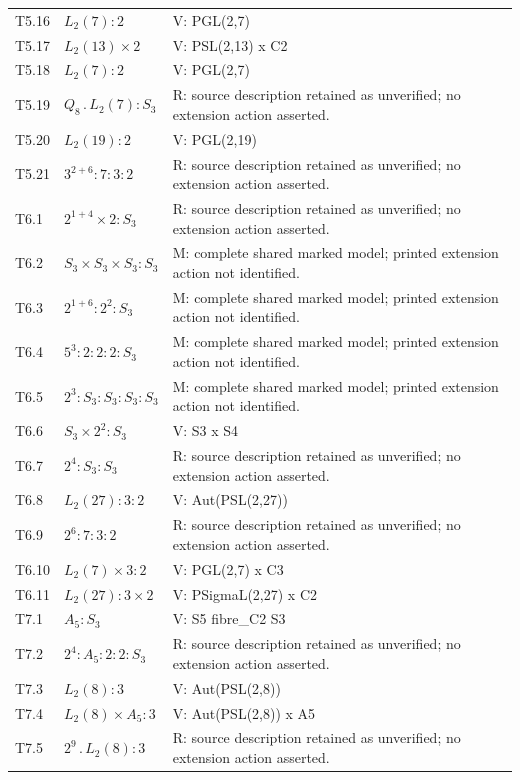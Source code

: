 \begin{longtable}{@{}lp{.40\linewidth}p{.46\linewidth}@{}}
T5.16 & $L_{2}(7) : 2$ & V: PGL(2,7)\\
T5.17 & $L_{2}(13) \times 2$ & V: PSL(2,13) x C2\\
T5.18 & $L_{2}(7) : 2$ & V: PGL(2,7)\\
T5.19 & $Q_{8} \mathbin{.} L_{2}(7) : S_{3}$ & R: source description retained as unverified; no extension action asserted.\\
T5.20 & $L_{2}(19) : 2$ & V: PGL(2,19)\\
T5.21 & $3^{2+6} : 7 : 3 : 2$ & R: source description retained as unverified; no extension action asserted.\\
T6.1 & $2^{1+4} \times 2 : S_{3}$ & R: source description retained as unverified; no extension action asserted.\\
T6.2 & $S_{3} \times S_{3} \times S_{3} : S_{3}$ & M: complete shared marked model; printed extension action not identified.\\
T6.3 & $2^{1+6} : 2^2 : S_{3}$ & M: complete shared marked model; printed extension action not identified.\\
T6.4 & $5^3 : 2 : 2 : 2 : S_{3}$ & M: complete shared marked model; printed extension action not identified.\\
T6.5 & $2^3 : S_{3} : S_{3} : S_{3} : S_{3}$ & M: complete shared marked model; printed extension action not identified.\\
T6.6 & $S_{3} \times 2^2 : S_{3}$ & V: S3 x S4\\
T6.7 & $2^4 : S_{3} : S_{3}$ & R: source description retained as unverified; no extension action asserted.\\
T6.8 & $L_{2}(27) : 3 : 2$ & V: Aut(PSL(2,27))\\
T6.9 & $2^6 : 7 : 3 : 2$ & R: source description retained as unverified; no extension action asserted.\\
T6.10 & $L_{2}(7) \times 3 : 2$ & V: PGL(2,7) x C3\\
T6.11 & $L_{2}(27) : 3 \times 2$ & V: PSigmaL(2,27) x C2\\
T7.1 & $A_{5} : S_{3}$ & V: S5 fibre\_C2 S3\\
T7.2 & $2^4 : A_{5} : 2 : 2 : S_{3}$ & R: source description retained as unverified; no extension action asserted.\\
T7.3 & $L_{2}(8) : 3$ & V: Aut(PSL(2,8))\\
T7.4 & $L_{2}(8) \times A_{5} : 3$ & V: Aut(PSL(2,8)) x A5\\
T7.5 & $2^9 \mathbin{.} L_{2}(8) : 3$ & R: source description retained as unverified; no extension action asserted.\\

\end{longtable}
